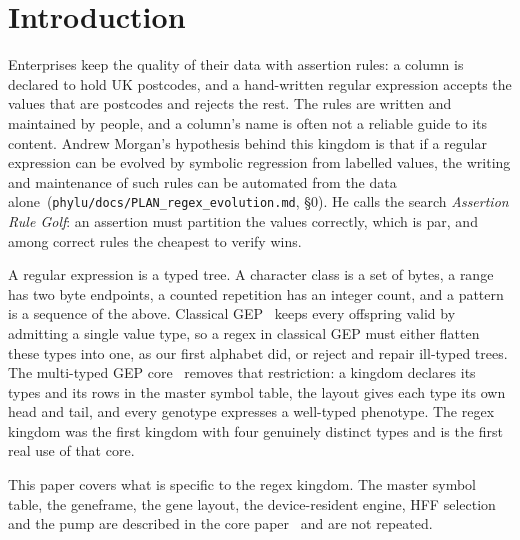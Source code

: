\documentclass[sigconf,nonacm]{acmart}
\newcommand{\src}[1]{{\small\nolinkurl{#1}}}
\begin{document}
\section{Introduction}
\label{sec:intro}

Enterprises keep the quality of their data with assertion rules: a column is
declared to hold UK postcodes, and a hand-written regular expression accepts the
values that are postcodes and rejects the rest. The rules are written and
maintained by people, and a column's name is often not a reliable guide to its
content. Andrew Morgan's hypothesis behind this kingdom is that if a regular
expression can be evolved by symbolic regression from labelled values, the
writing and maintenance of such rules can be automated from the data
alone~(\src{phylu/docs/PLAN_regex_evolution.md}, \S0). He calls the search
\emph{Assertion Rule Golf}: an assertion must partition the values correctly,
which is par, and among correct rules the cheapest to verify wins.

A regular expression is a typed tree. A character class is a set of bytes, a
range has two byte endpoints, a counted repetition has an integer count, and a
pattern is a sequence of the above. Classical GEP~\cite{ferreira2001gep} keeps
every offspring valid by admitting a single value type, so a regex in classical
GEP must either flatten these types into one, as our first alphabet did, or
reject and repair ill-typed trees. The multi-typed GEP core~\cite{morgan_core}
removes that restriction: a kingdom declares its types and its rows in the master
symbol table, the layout gives each type its own head and tail, and every
genotype expresses a well-typed phenotype. The regex kingdom was the first
kingdom with four genuinely distinct types and is the first real use of that
core.

This paper covers what is specific to the regex kingdom. The master symbol
table, the geneframe, the gene layout, the device-resident engine, HFF selection
and the pump are described in the core paper~\cite{morgan_core} and are not
repeated.
\end{document}
